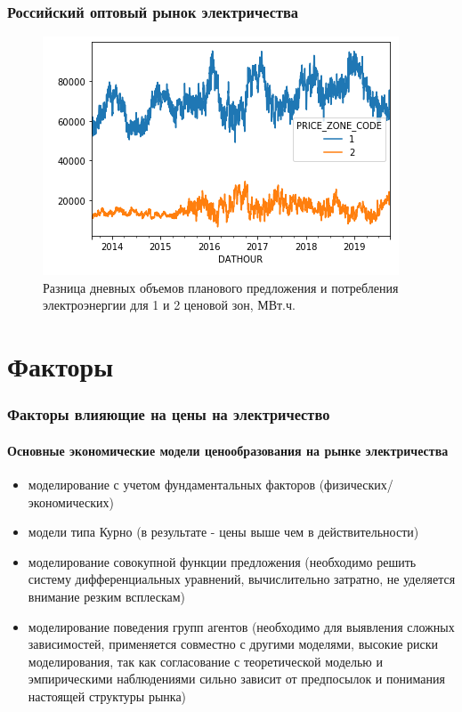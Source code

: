 \documentclass[c, dvipsnames]{beamer}  %
\begin{document}
\begin{frame}[shrink=5]
\frametitle{Российский оптовый рынок электричества} 

\begin{figure}
	\centering
	\includegraphics[width=0.7\linewidth]{screenshot011}
	\caption{Разница дневных объемов планового предложения и потребления электроэнергии для 1 и 2 ценовой зон, МВт.ч.}
	\label{fig:screenshot011}
\end{figure}




\end{frame}



\section{Факторы}


\begin{frame}[shrink=5]

\frametitle{Факторы  влияющие на цены на электричество} 

\framesubtitle{Основные экономические модели ценообразования на рынке электричества} 


\begin{itemize}
	\item  моделирование с учетом фундаментальных факторов (физических/экономических)
	\item модели типа Курно (в результате - цены выше чем в действительности)
	\item моделирование совокупной функции предложения (необходимо решить систему дифференциальных уравнений, вычислительно затратно, не уделяется внимание резким всплескам) 
	\item  моделирование поведения групп агентов  (необходимо для выявления сложных зависимостей, применяется совместно с другими моделями, высокие риски моделирования, так как согласование с теоретической моделью  и эмпирическими наблюдениями сильно зависит от предпосылок и понимания настоящей структуры рынка)
	
\end{itemize}

\end{frame}
\end{document}
